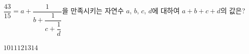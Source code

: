 $\dfrac{43}{15}=a+\dfrac{1}{b+\dfrac{1}{c+\dfrac{1}{d}}}$을 만족시키는 자연수 $a$, $b$, $c$, $d$에 대하여 $a+b+c+d$의 값은?
\begin{choices32}{$10$}{$11$}{$12$}{$13$}{$14$}\end{choices32}
